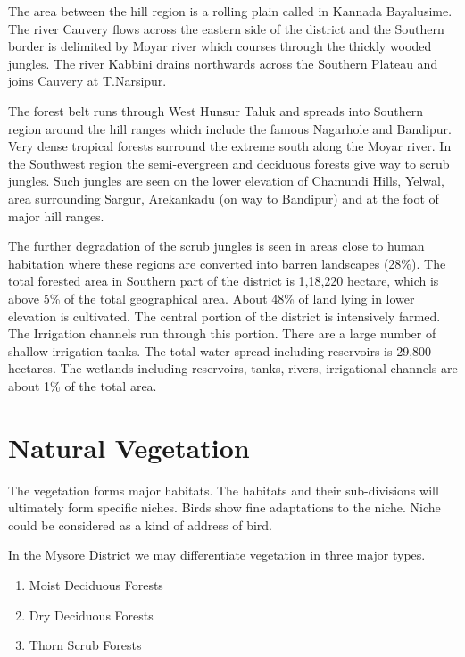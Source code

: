 \vskip 0.2cm

The area between the hill region is a rolling plain called 
in Kannada Bayalusime. The river Cauvery flows across the eastern 
side of the district and the Southern border is delimited by 
Moyar river which courses through the thickly wooded jungles. The 
river Kabbini drains northwards across the Southern Plateau and 
joins Cauvery at T.Narsipur. 

\vskip 0.2cm

The forest belt runs through West Hunsur Taluk and spreads 
into Southern region around the hill ranges which include the 
famous Nagarhole and Bandipur. Very dense tropical forests surround 
the extreme south along the Moyar river. In the Southwest 
region the semi-evergreen and deciduous forests give way to 
scrub jungles. Such jungles are seen on the lower elevation of 
Chamundi Hills, Yelwal, area surrounding Sargur, Arekankadu (on 
way to Bandipur) and at the foot of major hill ranges. 

\vskip 0.2cm

The further degradation of the scrub jungles is seen in 
areas close to human habitation where these regions are converted 
into barren landscapes (28\%). The total forested area in Southern 
part of the district is 1,18,220 hectare, which is above 5\% of 
the total geographical area. About 48\% of land lying in lower 
elevation is cultivated. The central portion of the district is 
intensively farmed. The Irrigation channels run through this 
portion. There are a large number of shallow irrigation tanks. 
The total water spread including reservoirs is 29,800 hectares. 
The wetlands including reservoirs, tanks, rivers, irrigational 
channels are about 1\% of the total area. 


\chapter{Natural Vegetation}%

The vegetation forms major habitats. The habitats and their 
sub-divisions will ultimately form specific niches. Birds show 
fine adaptations to the niche. Niche could be considered as a 
kind of address of bird. 

In the Mysore District we may differentiate vegetation in 
three major types. 
\begin{enumerate}
\itemsep=2pt
\item Moist Deciduous Forests 

\item Dry Deciduous Forests 

\item Thorn Scrub Forests 
\end{enumerate} 


